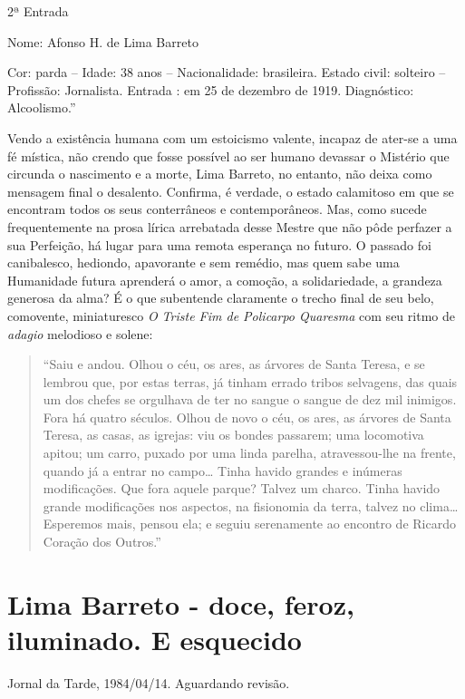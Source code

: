 \documentclass[
  letterpaper,
  DIV=11,
  numbers=noendperiod]{scrreprt}
\begin{document}
2ª Entrada

Nome: Afonso H. de Lima Barreto

Cor: parda -- Idade: 38 anos -- Nacionalidade: brasileira. Estado civil:
solteiro -- Profissão: Jornalista. Entrada : em 25 de dezembro de 1919.
Diagnóstico: Alcoolismo.''

Vendo a existência humana com um estoicismo valente, incapaz de ater-se
a uma fé mística, não crendo que fosse possível ao ser humano devassar o
Mistério que circunda o nascimento e a morte, Lima Barreto, no entanto,
não deixa como mensagem final o desalento. Confirma, é verdade, o estado
calamitoso em que se encontram todos os seus conterrâneos e
contemporâneos. Mas, como sucede frequentemente na prosa lírica
arrebatada desse Mestre que não pôde perfazer a sua Perfeição, há lugar
para uma remota esperança no futuro. O passado foi canibalesco,
hediondo, apavorante e sem remédio, mas quem sabe uma Humanidade futura
aprenderá o amor, a comoção, a solidariedade, a grandeza generosa da
alma? É o que subentende claramente o trecho final de seu belo,
comovente, miniaturesco \emph{O Triste Fim de Policarpo Quaresma} com
seu ritmo de \emph{adagio} melodioso e solene:

\begin{quote}
``Saiu e andou. Olhou o céu, os ares, as árvores de Santa Teresa, e se
lembrou que, por estas terras, já tinham errado tribos selvagens, das
quais um dos chefes se orgulhava de ter no sangue o sangue de dez mil
inimigos. Fora há quatro séculos. Olhou de novo o céu, os ares, as
árvores de Santa Teresa, as casas, as igrejas: viu os bondes passarem;
uma locomotiva apitou; um carro, puxado por uma linda parelha,
atravessou-lhe na frente, quando já a entrar no campo\ldots{} Tinha
havido grandes e inúmeras modificações. Que fora aquele parque? Talvez
um charco. Tinha havido grande modificações nos aspectos, na fisionomia
da terra, talvez no clima\ldots{} Esperemos mais, pensou ela; e seguiu
serenamente ao encontro de Ricardo Coração dos Outros.''
\end{quote}

\chapter{Lima Barreto - doce, feroz, iluminado. E
esquecido}\label{lima-barreto---doce-feroz-iluminado.-e-esquecido}

Jornal da Tarde, 1984/04/14. Aguardando revisão.

\hfill\break
\end{document}
